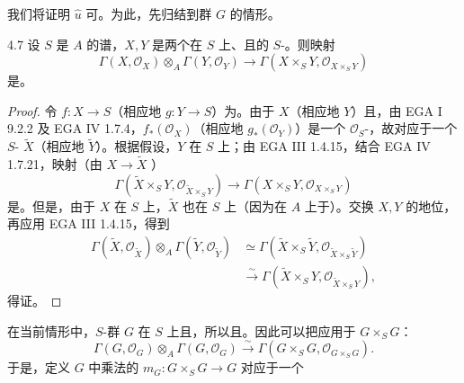 我们将证明 $\widehat u$ 可。为此，先归结到群 $G$ 的情形。
\begin{SGAresult}{}{4.7}
设 $S$ 是 $A$ 的谱，$X,Y$ 是两个在 $S$ 上、且的 $S$-。则映射
\[\Gamma(X,\mathcal O_X)\otimes_A\Gamma(Y,\mathcal O_Y)\longrightarrow\Gamma(X\times_SY,\mathcal O_{X\times_SY})\]
是。
\end{SGAresult}
\begin{proof}
令 $f:X\to S$（相应地 $g:Y\to S$）为。由于 $X$（相应地 $Y$）且，由 EGA I 9.2.2 及 EGA IV 1.7.4，$f_*(\mathcal O_X)$（相应地 $g_*(\mathcal O_Y)$）是一个 $\mathcal O_S$-，故对应于一个 $S$- $\widetilde X$（相应地 $\widetilde Y$）。根据假设，$Y$ 在 $S$ 上；由 EGA III 1.4.15，结合 EGA IV 1.7.21，映射（由 $X\to\widetilde X$ ）
\[\Gamma(\widetilde X\times_SY,\mathcal O_{\widetilde X\times_SY})\longrightarrow\Gamma(X\times_SY,\mathcal O_{X\times_SY})\]
是。但是，由于 $X$ 在 $S$ 上，$\widetilde X$ 也在 $S$ 上（因为在 $A$ 上于）。交换 $X,Y$ 的地位，再应用 EGA III 1.4.15，得到
\begin{align*}
\Gamma(\widetilde X,\mathcal O_{\widetilde X})\otimes_A\Gamma(\widetilde Y,\mathcal O_{\widetilde Y})
&\simeq\Gamma(\widetilde X\times_S\widetilde Y,\mathcal O_{\widetilde X\times_S\widetilde Y})\\
&\xrightarrow{\sim}\Gamma(\widetilde X\times_SY,\mathcal O_{\widetilde X\times_SY}),
\end{align*}
得证。
\end{proof}
在当前情形中，$S$-群 $G$ 在 $S$ 上且，所以且。因此可以把应用于 $G\times_SG$：
\[\Gamma(G,\mathcal O_G)\otimes_A\Gamma(G,\mathcal O_G)\xrightarrow{\sim}\Gamma(G\times_SG,\mathcal O_{G\times_SG}).\]
于是，定义 $G$ 中乘法的 $m_G:G\times_SG\to G$ 对应于一个
